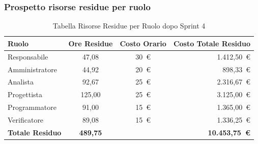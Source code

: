 \subsubsection{Prospetto risorse residue per ruolo}
\begin{table}[H]
    \centering
    \renewcommand{\arraystretch}{1.3}
    \begin{tabularx}{\textwidth}{|X|c|c|r|}
        \hline
        \textbf{Ruolo} & \textbf{Ore Residue} & \textbf{Costo Orario} &
        \textbf{Costo Totale Residuo} \\
        \hline
        Responsabile   & 47,08 & 30~\euro & 1.412{,}50~\euro \\
        Amministratore & 44,92 & 20~\euro &   898{,}33~\euro \\
        Analista       & 92,67 & 25~\euro & 2.316{,}67~\euro \\
        Progettista    & 125,00 & 25~\euro & 3.125{,}00~\euro \\
        Programmatore  & 91,00 & 15~\euro & 1.365{,}00~\euro \\
        Verificatore   & 89,08 & 15~\euro & 1.336{,}25~\euro \\
        \hline
        \textbf{Totale Residuo} & \textbf{489,75} & & \textbf{10.453{,}75~\euro} \\
        \hline
    \end{tabularx}
    \caption{Tabella Risorse Residue per Ruolo dopo Sprint 4}
\end{table}

